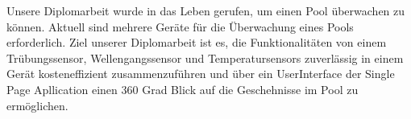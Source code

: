 Unsere Diplomarbeit wurde in das Leben gerufen, um einen Pool überwachen zu können.
Aktuell sind mehrere Geräte für die Überwachung eines Pools erforderlich.
Ziel unserer Diplomarbeit ist es, die Funktionalitäten 
von einem Trübungssensor, Wellengangssensor und Temperatursensors zuverlässig in einem Gerät kosteneffizient zusammenzuführen 
und über ein UserInterface der Single Page Apllication einen 360 Grad Blick auf die Geschehnisse im Pool zu ermöglichen. 